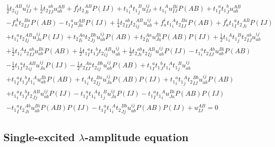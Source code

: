 \begin{gather*}
\frac{1}{2}{t_2}^{AB}_{ij} u^{ij}_{IJ}
+ \frac{1}{2}{t_2}^{ab}_{IJ} u^{AB}_{ab}
+ f^{i}_{I} {t_2}^{AB}_{Ji} P(IJ)
+ {t_1}^{A}_{i} {t_1}^{B}_{j} u^{ij}_{IJ}
+ {t_1}^{A}_{i} u^{Bi}_{IJ} P(AB)
+ {t_1}^{a}_{I} {t_1}^{b}_{J} u^{AB}_{ab} \\
- f^{A}_{a} {t_2}^{Ba}_{IJ} P(AB)
- {t_1}^{a}_{I} u^{AB}_{Ja} P(IJ)   
+ \frac{1}{4}{t_2}^{ab}_{IJ} {t_2}^{AB}_{ij} u^{ij}_{ab}
+ f^{i}_{a} {t_1}^{A}_{i} {t_2}^{Ba}_{IJ} P(AB)
+ f^{i}_{a} {t_1}^{a}_{I} {t_2}^{AB}_{Ji} P(IJ) \\
+ {t_1}^{a}_{i} {t_2}^{AB}_{Ij} u^{ij}_{Ja} P(IJ) 
+ {t_2}^{Aa}_{Ii} {t_2}^{Bb}_{Jj} u^{ij}_{ab} P(AB)
+ {t_2}^{Aa}_{Ii} u^{Bi}_{Ja} P(AB) P(IJ)
+  \frac{1}{2}{t_1}^{A}_{i} {t_1}^{B}_{j} {t_2}^{ab}_{IJ} u^{ij}_{ab} \\
+  \frac{1}{2}{t_1}^{A}_{i} {t_2}^{ab}_{IJ} u^{Bi}_{ab} P(AB)
+  \frac{1}{2}{t_1}^{a}_{I} {t_1}^{b}_{J} {t_2}^{AB}_{ij} u^{ij}_{ab}
+  \frac{1}{2}{t_2}^{ab}_{Ji} {t_2}^{AB}_{Ij} u^{ij}_{ab} P(IJ) 
- {t_1}^{a}_{i} {t_2}^{Ab}_{IJ} u^{Bi}_{ab} P(AB) \\
-  \frac{1}{2}{t_1}^{a}_{I} {t_2}^{AB}_{ij} u^{ij}_{Ja} P(IJ)
-  \frac{1}{2}{t_2}^{Aa}_{IJ} {t_2}^{Bb}_{ij} u^{ij}_{ab} P(AB)
+ {t_1}^{a}_{I} {t_1}^{b}_{J} {t_1}^{A}_{i} {t_1}^{B}_{j} u^{ij}_{ab} \\
+ {t_1}^{a}_{I} {t_1}^{b}_{J} {t_1}^{A}_{i} u^{Bi}_{ab} P(AB)
+ {t_1}^{A}_{i} {t_2}^{Ba}_{Ij} u^{ij}_{Ja} P(AB) P(IJ)
+ {t_1}^{a}_{i} {t_1}^{A}_{j} {t_2}^{Bb}_{IJ} u^{ij}_{ab} P(AB) \\
+ {t_1}^{a}_{i} {t_1}^{b}_{I} {t_2}^{AB}_{Jj} u^{ij}_{ab} P(IJ)
- {t_1}^{a}_{I} {t_1}^{A}_{i} {t_1}^{B}_{j} u^{ij}_{Ja} P(IJ)
- {t_1}^{a}_{I} {t_1}^{A}_{i} u^{Bi}_{Ja} P(AB) P(IJ)  \\
- {t_1}^{a}_{I} {t_2}^{Ab}_{Ji} u^{Bi}_{ab} P(AB) P(IJ)
- {t_1}^{a}_{I} {t_1}^{A}_{i} {t_2}^{Bb}_{Jj} u^{ij}_{ab} P(AB) P(IJ)
+ u^{AB}_{IJ} = 0
\end{gather*}



\subsection{Single-excited $\lambda$-amplitude equation}

